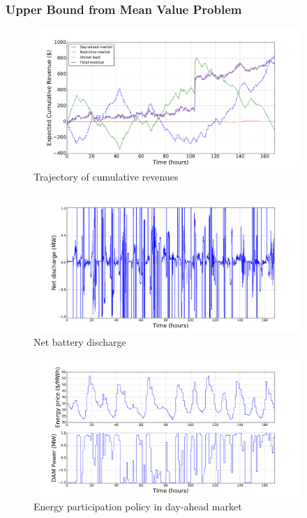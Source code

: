 \documentclass[11pt,twoside]{article}
\begin{document}
\subsubsection{Upper Bound from Mean Value Problem}
\begin{figure}[h!]
\begin{center}
\includegraphics[width=4in]{Figures/Plots/fullproblem_det/cumulative_rev_fp_dt.pdf} \caption{Trajectory of cumulative revenues}\label{cumulative_rev_fp_dt}\end{center}
\end{figure}
\begin{figure}[h!]
\begin{center}
\includegraphics[width=4in]{Figures/Plots/fullproblem_det/netpower_fp_dt.pdf} \caption{Net battery discharge}\label{netpower_fp_dt}\end{center}
\end{figure}
\begin{figure}[h!]
\begin{center}
\includegraphics[width=4in]{Figures/Plots/fullproblem_det/Pdam_fp_dt.pdf} \caption{Energy participation policy in day-ahead market}\label{Pdam_fp_dt}\end{center}
\end{figure}
\end{document}
